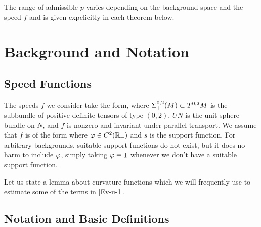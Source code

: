 The range of admissible $p$ varies depending on the background space and the speed $f$ and is given expclicitly in each theorem below.


\section{Background and Notation}
\label{sec:background}

\subsection{Speed Functions}
\label{subsec:bg_speed}

The speeds $f$ we consider take the form,
where $\Sigma^{0,2}_{+}(M)\subset T^{0,2}M$ is the subbundle of positive definite tensors of type $(0,2)$, $UN$ is the unit sphere bundle on $N$, and $f$ is nonzero and invariant under parallel transport. We assume that $f$ is of the form
where $\varphi\in C^2(\mathbb{R}_+)$ and $s$ is the support function. For arbitrary backgrounds, suitable support functions do not exist, but it does no harm to include $\varphi$, simply taking $\varphi \equiv 1$ whenever we don't have a suitable support function.

Let us state a lemma about curvature functions which we will frequently use to estimate some of the terms in \eqref{Ev-u-1}.

\subsection{Notation and Basic Definitions}
\label{subsec:bg_notation}


